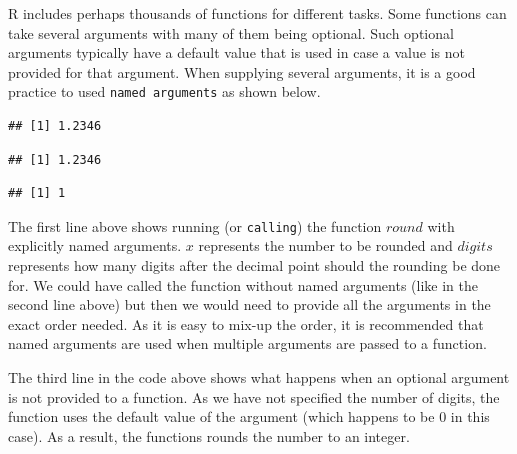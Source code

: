 \documentclass[10pt, letterpaper, twoside]{memoir}\usepackage{knitr}
\begin{document}
R includes perhaps thousands of functions for different tasks. Some functions can take several arguments with many of them being optional. Such optional arguments typically have a default value that is used in case a value is not provided for that argument. When supplying several  arguments, it is a good practice to used \texttt{named arguments} as shown below.

\begin{knitrout}
\color{fgcolor}\begin{kframe}
\begin{alltt}
\hlstd{(} \hlstd{=} \hlstd{,}  \hlstd{=} \hlstd{)}
\end{alltt}
\begin{verbatim}
## [1] 1.2346
\end{verbatim}
\begin{alltt}
\hlstd{(}\hlstd{,} \hlstd{)}
\end{alltt}
\begin{verbatim}
## [1] 1.2346
\end{verbatim}
\begin{alltt}
\hlstd{(}\hlstd{)}
\end{alltt}
\begin{verbatim}
## [1] 1
\end{verbatim}
\end{kframe}
\end{knitrout}

The first line above shows running (or \texttt{calling}) the function $round$  with explicitly named arguments. $x$ represents the number to be rounded and $digits$ represents how many digits after the decimal point should the rounding be done for. We could have called the function without named arguments (like in the second line above) but then we would need to provide all the arguments in the exact order needed. As it is easy to mix-up the order, it is recommended that named arguments are used when multiple arguments are passed to a function.

The third line in the code above shows what happens when an optional argument is not provided to a function. As we have not specified the number of digits, the function uses the default value of the argument (which happens to be $0$ in this case). As a result, the functions rounds the number to an integer.
\end{document}
